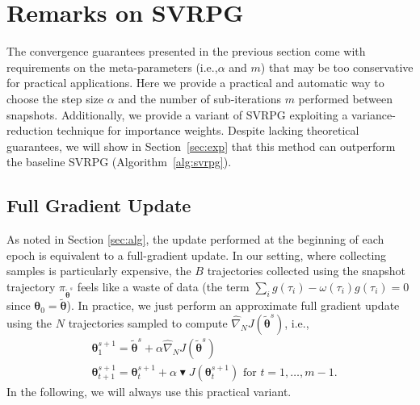 \documentclass{article}
\makeatletter
\theoremstyle{remark}
\theoremstyle{definition}
\DeclareRobustCommand{\ie}{i.e.,\@\xspace}
\newcommand{\vtheta}{\boldsymbol{\theta}}
\newcommand{\gradApp}[2]{\widehat{\nabla}_{#2}J(#1)}
\newcommand{\wt}[1]{\widetilde{#1}}
\makeatother
\begin{document}
\vspace{-0.05in}
\section{Remarks on SVRPG}
\vspace{-0.05in}
The convergence guarantees presented in the previous section come with requirements on the meta-parameters (\ie $\alpha$ and $m$) that may be too conservative for practical applications.
Here we provide a practical and automatic way to choose the step size $\alpha$ and the number of sub-iterations $m$ performed between snapshots.
Additionally, we provide a variant of SVRPG exploiting a variance-reduction technique for importance weights.
Despite lacking theoretical guarantees, we will show in Section~\ref{sec:exp} that this method can outperform the baseline SVRPG (Algorithm~\ref{alg:svrpg}).

\vspace{-0.05in}
\subsection{Full Gradient Update}
\vspace{-0.05in}
As noted in Section \ref{sec:alg}, the update performed at the beginning of each epoch is equivalent to a full-gradient update. In our setting, where collecting samples is particularly expensive, the $B$ trajectories collected using the snapshot trajectory $\pi_{\wt{\vtheta}^s}$ feels like a waste of data (the term $\sum_i g(\tau_i) - \omega(\tau_i) g(\tau_i) =0$ since $\vtheta_0 = \wt{\vtheta}$).
In practice, we just perform an approximate full gradient update using the $N$ trajectories sampled to compute $\gradApp{\wt{\vtheta}^s}{N}$, \ie
\begin{align*}
	&\vtheta_{1}^{s+1} = \wt{\vtheta}^s + \alpha\gradApp{\wt{\vtheta}^s}{N} \\
	&\vtheta_{t+1}^{s+1} = \vtheta_t^{s+1} + \alpha 
        \blacktriangledown J(\vtheta^{s+1}_t)
        \text{ for $t=1,\dots,m-1$}.
\end{align*}
In the following, we will always use this practical variant.

\vspace{-0.05in}
\end{document}
